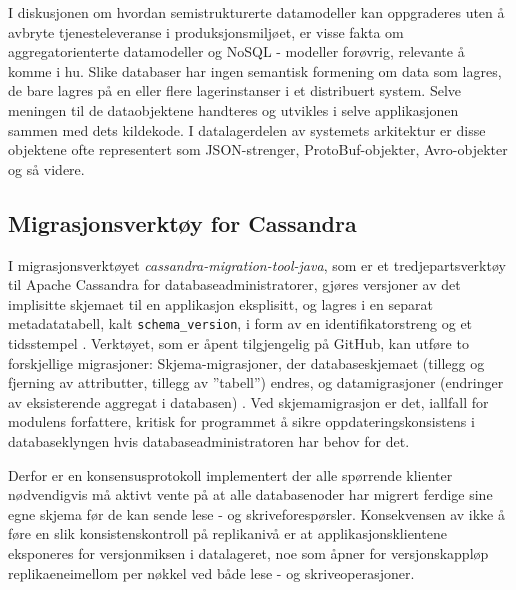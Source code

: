 I diskusjonen om hvordan semistrukturerte datamodeller kan oppgraderes uten å avbryte tjenesteleveranse i produksjonsmiljøet, er visse fakta om aggregatorienterte datamodeller og NoSQL - modeller forøvrig, relevante å komme i hu. Slike databaser har ingen semantisk formening om data som lagres, de bare lagres på en eller flere lagerinstanser i et distribuert system. Selve meningen til de dataobjektene handteres og utvikles i selve applikasjonen sammen med dets kildekode. I datalagerdelen av systemets arkitektur er disse objektene ofte representert som JSON-strenger, ProtoBuf-objekter, Avro-objekter og så videre.


\subsection{Migrasjonsverktøy for Cassandra}

I migrasjonsverktøyet \emph{cassandra-migration-tool-java}, som er et tredjepartsverktøy til Apache Cassandra for databaseadministratorer, gjøres versjoner av det implisitte skjemaet til en applikasjon eksplisitt, og lagres i en separat metadatatabell, kalt \texttt{schema_version}, i form av en identifikatorstreng og et tidsstempel \citep{bozic2015}. Verktøyet, som er åpent tilgjengelig på GitHub, kan utføre to forskjellige migrasjoner: Skjema-migrasjoner, der databaseskjemaet (tillegg og fjerning av attributter, tillegg av ''tabell'') endres, og datamigrasjoner (endringer av eksisterende aggregat i databasen) \citep{bozic2015}. Ved skjemamigrasjon er det, iallfall for modulens forfattere, kritisk for programmet å sikre oppdateringskonsistens i databaseklyngen hvis databaseadministratoren har behov for det. 

Derfor er en konsensusprotokoll implementert der alle spørrende klienter nødvendigvis må aktivt vente på at alle databasenoder har migrert ferdige sine egne skjema før de kan sende lese - og skriveforespørsler. Konsekvensen av ikke å føre en slik konsistenskontroll på replikanivå er at applikasjonsklientene eksponeres for versjonmiksen i datalageret, noe som åpner for versjonskappløp replikaeneimellom per nøkkel ved både lese - og skriveoperasjoner.

